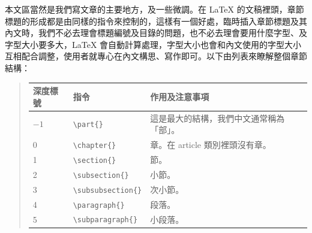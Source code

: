 本文區當然是我們寫文章的主要地方，及一些微調。在 \LaTeX{} 的文稿裡頭，章節標題的形成都是由同樣的指令來控制的，這樣有一個好處，臨時插入章節標題及其內文時，我們不必去理會標題編號及目錄的問題，也不必去理會要用什麼字型、及字型大小要多大，\LaTeX{} 會自動計算處理，字型大小也會和內文使用的字型大小互相配合調整，使用者就專心在內文構思、寫作即可。以下由列表來瞭解整個章節結構：

\begin{quote}
   \begin{tabular}{lll}
      深度標號 & 指令                    & 作用及注意事項                           \\
      \hline
      $-1$     & \verb|\part{}| & 這是最大的結構，我們中文通常稱為「部」。 \\
      0        & \verb|\chapter{}| & 章。在 article 類別裡頭沒有章。          \\
      1        & \verb|\section{}| & 節。                                     \\
      2        & \verb|\subsection{}| & 小節。                                   \\
      3        & \verb|\subsubsection{}| & 次小節。                                 \\
      4        & \verb|\paragraph{}| & 段落。                                   \\
      5        & \verb|\subparagraph{}| & 小段落。                                 \\
   \end{tabular}
\end{quote}

